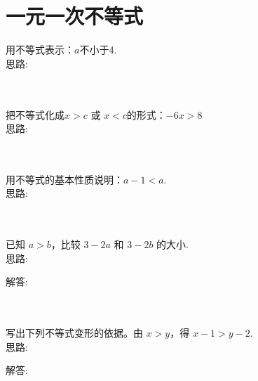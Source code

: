 \section{一元一次不等式}

\item {
    用不等式表示：$a$不小于4.
    \ifshowSolution
        \fangsong{}
        \\
        思路:
    \else
        \\ \\ \\
    \fi
}

\item {
    把不等式化成$x>c$ 或 $x<c$的形式：$-6x > 8$
    \ifshowSolution
        \fangsong{}
        \\
        思路:
    \else
        \\ \\ \\
    \fi
}

\item {
    用不等式的基本性质说明：$a-1<a$.
    \ifshowSolution
        \fangsong{}
        \\
        思路:
    \else
        \\ \\ \\
    \fi
}

\item {
    已知 $a > b$，比较 $3-2a$ 和 $3-2b$ 的大小.
    \ifshowSolution
        \fangsong{}
        \\
        思路:

        解答: 
    \else
        \\ \\ \\
    \fi
}

\item {
    写出下列不等式变形的依据。由 $x > y$，得 $x-1 > y-2$.
    \ifshowSolution
        \fangsong{}
        \\
        思路:

        解答: 
    \else
        \\ \\ \\
    \fi
}